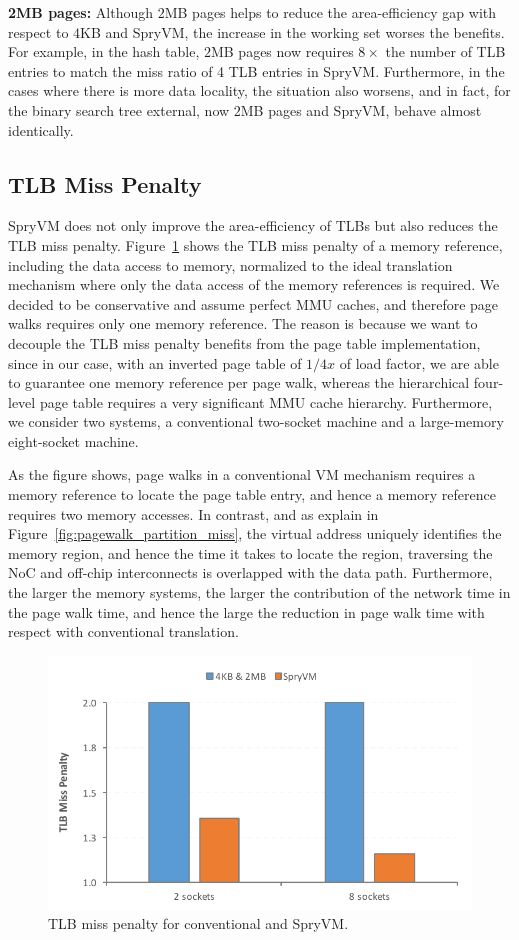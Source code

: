 \noindent\textbf{2MB pages:} Although $2$MB pages helps to reduce the
area-efficiency gap with respect to $4$KB and SpryVM, the increase in
the working set worses the benefits. For example, in the hash table,
$2$MB pages now requires $8\times$ the number of TLB entries to match
the miss ratio of 4 TLB entries in SpryVM. Furthermore, in the cases
where there is more data locality, the situation also worsens, and in
fact, for the binary search tree external, now $2$MB pages and SpryVM,
behave almost identically.

\subsection{TLB Miss Penalty}

SpryVM does not only improve the area-efficiency of TLBs but also reduces the TLB miss penalty. Figure~\ref{fig:penalty} shows the TLB miss penalty of a memory reference, including the data access to memory, normalized to the ideal translation mechanism where only the data access of the memory references is required. We decided to be conservative and assume perfect MMU caches, and therefore page walks requires only one memory reference. The reason is because we want to decouple the TLB miss penalty benefits from the page table implementation, since in our case, with an inverted page table of $1/4x$ of load factor, we are able to guarantee one memory reference per page walk, whereas the hierarchical four-level page table requires a very significant MMU cache hierarchy. Furthermore, we consider two systems, a conventional two-socket machine and a large-memory eight-socket machine.

As the figure shows, page walks in a conventional VM mechanism requires a memory reference to locate the page table entry, and hence a memory reference requires two memory accesses. In contrast, and as explain in Figure~\ref{fig:pagewalk_partition_miss}, the virtual address uniquely identifies the memory region, and hence the time it takes to locate the region, traversing the NoC and off-chip interconnects is overlapped with the data path. Furthermore, the larger the memory systems, the larger the contribution of the network time in the page walk time, and hence the large the reduction in page walk time with respect with conventional translation. 

\begin{figure}[t]
	\centering
	\includegraphics[width=0.8\columnwidth]{graphs/penalty.pdf}
	\caption{TLB miss penalty for conventional and SpryVM.}
	\label{fig:penalty}
\end{figure}

